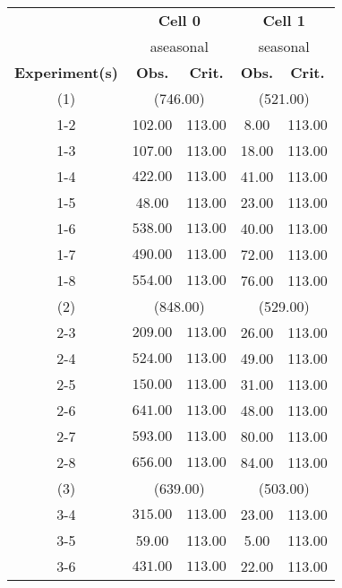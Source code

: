 \begin{table}[ht]
\centering
\small
\begin{tabular*}{\textwidth}{@{\extracolsep{\fill} }ccccc}
  \toprule
& \multicolumn{2}{c}{\textbf{Cell 0}} & \multicolumn{2}{c}{\textbf{Cell 1}} \\
& \multicolumn{2}{c}{aseasonal} & \multicolumn{2}{c}{seasonal} \\
\cmidrule(lr){2-3} \cmidrule(lr){4-5}
\textbf{Experiment(s)} & \textbf{Obs.} & \textbf{Crit.} & \textbf{Obs.} & \textbf{Crit.} \\ 
  \midrule
  (1) & \multicolumn{2}{c}{(746.00)} & \multicolumn{2}{c}{(521.00)} \\ 
1-2 & 102.00 & 113.00 & 8.00 & 113.00 \\ 
  1-3 & 107.00 & 113.00 & 18.00 & 113.00 \\ 
  1-4 & \(\mathbf{422.00}\) & \(\mathbf{113.00}\) & 41.00 & 113.00 \\ 
  1-5 & 48.00 & 113.00 & 23.00 & 113.00 \\ 
  1-6 & \(\mathbf{538.00}\) & \(\mathbf{113.00}\) & 40.00 & 113.00 \\ 
  1-7 & \(\mathbf{490.00}\) & \(\mathbf{113.00}\) & 72.00 & 113.00 \\ 
  1-8 & \(\mathbf{554.00}\) & \(\mathbf{113.00}\) & 76.00 & 113.00 \\ [1ex]
  (2) & \multicolumn{2}{c}{(848.00)} & \multicolumn{2}{c}{(529.00)} \\
   2-3 & \(\mathbf{209.00}\) & \(\mathbf{113.00}\) & 26.00 & 113.00 \\ 
  2-4 & \(\mathbf{524.00}\) & \(\mathbf{113.00}\) & 49.00 & 113.00 \\ 
  2-5 & \(\mathbf{150.00}\) & \(\mathbf{113.00}\) & 31.00 & 113.00 \\ 
  2-6 & \(\mathbf{641.00}\) & \(\mathbf{113.00}\) & 48.00 & 113.00 \\ 
  2-7 & \(\mathbf{593.00}\) & \(\mathbf{113.00}\) & 80.00 & 113.00 \\ 
  2-8 & \(\mathbf{656.00}\) & \(\mathbf{113.00}\) & 84.00 & 113.00 \\ 
   [1ex]
(3) & \multicolumn{2}{c}{(639.00)} & \multicolumn{2}{c}{(503.00)} \\
   3-4 & \(\mathbf{315.00}\) & \(\mathbf{113.00}\) & 23.00 & 113.00 \\ 
  3-5 & 59.00 & 113.00 & 5.00 & 113.00 \\ 
  3-6 & \(\mathbf{431.00}\) & \(\mathbf{113.00}\) & 22.00 & 113.00 \\ 

\end{tabular*}
\end{table}
